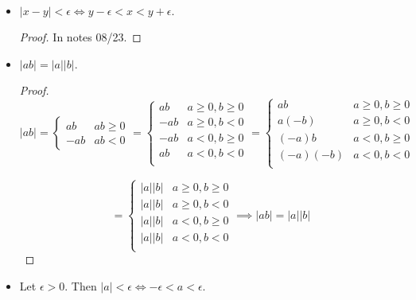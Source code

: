 \begin{itemize}

\item \begin{proposition}\label{ra.abs.fact1} \(|x-y| < \epsilon \iff y - \epsilon < x < y + \epsilon.\) \end{proposition}

\begin{proof}In notes 08/23.\end{proof}

\item \begin{proposition} \( |ab| = |a||b|. \)\end{proposition}

\begin{proof} \[| ab | = \begin{cases} 
      ab & ab \geq 0 \\
      -ab & ab < 0 
   \end{cases} = \begin{cases} 
      ab & a \geq 0,  b \geq 0 \\
      -ab & a \geq 0, b < 0 \\ 
      -ab & a < 0, b \geq 0 \\ 
      ab & a < 0,  b < 0 \\
   \end{cases} = \begin{cases} 
      ab & a \geq 0,  b \geq 0 \\
      a(-b) & a \geq 0, b < 0 \\ 
      (-a)b & a < 0, b \geq 0 \\ 
      (-a)(-b) & a < 0,  b < 0 \\
   \end{cases}
\]


\[= \begin{cases} 
      |a||b| & a \geq 0,  b \geq 0 \\
      |a||b| & a \geq 0, b < 0 \\ 
      |a||b| & a < 0, b \geq 0 \\ 
      |a||b| & a < 0,  b < 0 \\
   \end{cases} \implies | ab | = |a||b| 
\]

\end{proof}

\item \begin{proposition} Let \(\epsilon >0\). Then \(|a| < \epsilon \iff -\epsilon < a < \epsilon\). \end{proposition}


\end{itemize}
